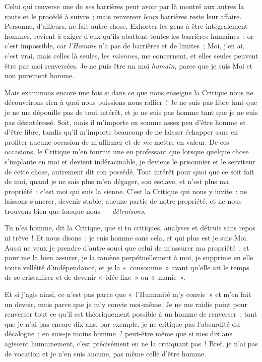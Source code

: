 \documentclass[french,twoside]{book} %
\begin{document}
Celui qui renverse une de \emph{ses} barrières peut avoir par là montré aux autres la route et le procédé à suivre ; mais renverser \emph{leurs} barrières reste leur affaire. Personne, d’ailleurs, ne fait autre chose. Exhorter les gens à être intégralement hommes, revient à exiger d’eux qu’ils abattent toutes les barrières humaines ; or c’est impossible, car \emph{l’Homme} n’a pas de barrières et de limites ; Moi, j’en ai, c’est vrai, mais celles là seules, les \emph{miennes}, me concernent, et elles seules peuvent être par moi renversées. Je ne puis être un moi \emph{humain, }parce que je suis Moi et non purement homme.\par
Mais examinons encore une fois si dans ce que nous enseigne la Critique nous ne découvrirons rien à quoi nous puissions nous rallier ! Je ne suis pas libre tant que je ne me dépouille pas de tout intérêt, et je ne suis pas homme tant que je ne suis pas désintéressé. Soit, mais il m’importe en somme assez peu d’être homme et d’être libre, tandis qu’il m’importe beaucoup de ne laisser échapper sans en profiter aucune occasion de m’affirmer et de \emph{me} mettre en valeur. De ces occasions, le Critique m’en fournit une en professant que lorsque quelque chose s’implante en moi et devient indéracinable, je deviens le prisonnier et le serviteur de cette chose, autrement dit son possédé. Tout intérêt pour quoi que ce soit fait de moi, quand je ne sais plus m’en dégager, son esclave, et n’est plus ma propriété : c’est moi qui suis la sienne. C’est la Critique qui nous y invite : ne laissons s’ancrer, devenir stable, aucune partie de notre propriété, et ne nous trouvons bien que lorsque nous — \emph{détruisons}.\par
Tu n’es homme, dit la Critique, que si tu critiques, analyses et détruis sans repos ni trêve ! Et nous disons : je suis homme sans cela, et qui plus est je suis Moi. Aussi ne veux je prendre d’autre souci que celui de m’assurer ma propriété ; et pour me la bien assurer,  je la ramène perpétuellement à moi, je supprime en elle toute velléité d’indépendance, et je la « consomme » avant qu’elle ait le temps de se cristalliser et de devenir « idée fixe » ou « manie ».\par
Et si j’agis ainsi, ce n’est pas parce que « l’Humanité m’y convie » et m’en fait un devoir, mais parce que je m’y convie moi-même. Je ne me raidis point pour renverser tout ce qu’il est théoriquement possible à un homme de renverser ; tant que je n’ai pas encore dix ans, par exemple, je ne critique pas l’absurdité du décalogue ; en suis-je moins homme ? peut-être même que si mes dix ans agissent humainement, c’est précisément en ne la critiquant pas ! Bref, je n’ai pas de vocation et je n’en suis aucune, pas même celle d’être homme.\par
\end{document}
